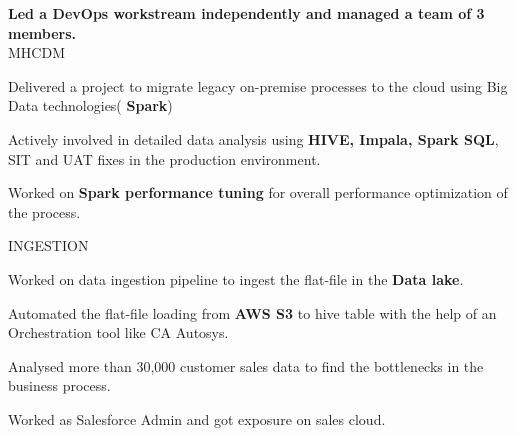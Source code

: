\documentclass[]{deedy-resume-openfont}
\begin{document}
\begin{minipage}[t]{0.66\textwidth}
\sectionsep



\vspace{\topsep} %
\textbf{Led a DevOps workstream independently and managed a team of 3 members.
} \\
{MHCDM}
\begin{tightemize}
\item Delivered a project to migrate legacy on-premise processes to the cloud using Big Data technologies( 
\textbf{Spark})
\item Actively involved in detailed data analysis using \textbf{HIVE, Impala, Spark SQL}, SIT and UAT fixes in the 
production environment.
\item Worked on \textbf{Spark performance tuning} for overall performance optimization of the process.
\end{tightemize}

\vspace{\topsep}
{INGESTION}

\begin{tightemize}
\item Worked on data ingestion pipeline to ingest the flat-file in the \textbf{Data lake}.
\item Automated the flat-file loading from \textbf{AWS S3} to hive table with the help of an Orchestration tool like CA 
Autosys.

\end{tightemize}

\sectionsep

\vspace{\topsep} %
\begin{tightemize}
\item Analysed more than 30,000 customer sales data to find the bottlenecks in the business process.
\item Worked as Salesforce Admin and got exposure on sales cloud. 

\end{tightemize}


\sectionsep










\end{minipage}
\end{document}
